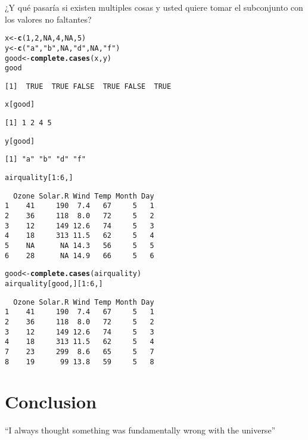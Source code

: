 \documentclass{article}\usepackage[]{graphicx}\usepackage[]{color}
\makeatletter
\newcommand{\hlnum}[1]{\textcolor[rgb]{0.686,0.059,0.569}{#1}}%
\newcommand{\hlstr}[1]{\textcolor[rgb]{0.192,0.494,0.8}{#1}}%
\newcommand{\hlopt}[1]{\textcolor[rgb]{0,0,0}{#1}}%
\newcommand{\hlstd}[1]{\textcolor[rgb]{0.345,0.345,0.345}{#1}}%
\newcommand{\hlkwb}[1]{\textcolor[rgb]{0.69,0.353,0.396}{#1}}%
\newcommand{\hlkwd}[1]{\textcolor[rgb]{0.737,0.353,0.396}{\textbf{#1}}}%
\newenvironment{kframe}{%
 \def\at@end@of@kframe{}%
 \ifinner\ifhmode%
  \def\at@end@of@kframe{\end{minipage}}%
  \begin{minipage}{\columnwidth}%
 \fi\fi%
 \def\FrameCommand##1{\hskip\@totalleftmargin \hskip-\fboxsep
 \colorbox{shadecolor}{##1}\hskip-\fboxsep
     \hskip-\linewidth \hskip-\@totalleftmargin \hskip\columnwidth}%
 \MakeFramed {\advance\hsize-\width
   \@totalleftmargin\z@ \linewidth\hsize
   \@setminipage}}%
 {\par\unskip\endMakeFramed%
 \at@end@of@kframe}
\newenvironment{knitrout}{}{} %
\makeatother
\begin{document}
    ¿Y qué pasaría si existen multiples cosas y usted quiere tomar el subconjunto con los valores no faltantes?
\begin{knitrout}
\color{fgcolor}\begin{kframe}
\begin{alltt}
  \hlstd{x} \hlkwb{<-} \hlkwd{c}\hlstd{(}\hlnum{1}\hlstd{,} \hlnum{2}\hlstd{,} \hlnum{NA}\hlstd{,} \hlnum{4}\hlstd{,} \hlnum{NA}\hlstd{,} \hlnum{5}\hlstd{)}
  \hlstd{y} \hlkwb{<-} \hlkwd{c}\hlstd{(}\hlstr{"a"}\hlstd{,} \hlstr{"b"}\hlstd{,} \hlnum{NA}\hlstd{,} \hlstr{"d"}\hlstd{,} \hlnum{NA}\hlstd{,} \hlstr{"f"}\hlstd{)}
  \hlstd{good} \hlkwb{<-} \hlkwd{complete.cases}\hlstd{(x, y)}
  \hlstd{good}
\end{alltt}
\begin{verbatim}
[1]  TRUE  TRUE FALSE  TRUE FALSE  TRUE
\end{verbatim}
\begin{alltt}
  \hlstd{x[good]}
\end{alltt}
\begin{verbatim}
[1] 1 2 4 5
\end{verbatim}
\begin{alltt}
  \hlstd{y[good]}
\end{alltt}
\begin{verbatim}
[1] "a" "b" "d" "f"
\end{verbatim}
\end{kframe}
\end{knitrout}

\begin{knitrout}
\color{fgcolor}\begin{kframe}
\begin{alltt}
  \hlstd{airquality[}\hlnum{1}\hlopt{:}\hlnum{6}\hlstd{, ]}
\end{alltt}
\begin{verbatim}
  Ozone Solar.R Wind Temp Month Day
1    41     190  7.4   67     5   1
2    36     118  8.0   72     5   2
3    12     149 12.6   74     5   3
4    18     313 11.5   62     5   4
5    NA      NA 14.3   56     5   5
6    28      NA 14.9   66     5   6
\end{verbatim}
\begin{alltt}
  \hlstd{good} \hlkwb{<-} \hlkwd{complete.cases}\hlstd{(airquality)}
  \hlstd{airquality[good, ][}\hlnum{1}\hlopt{:}\hlnum{6}\hlstd{, ]}
\end{alltt}
\begin{verbatim}
  Ozone Solar.R Wind Temp Month Day
1    41     190  7.4   67     5   1
2    36     118  8.0   72     5   2
3    12     149 12.6   74     5   3
4    18     313 11.5   62     5   4
7    23     299  8.6   65     5   7
8    19      99 13.8   59     5   8
\end{verbatim}
\end{kframe}
\end{knitrout}
\section{Conclusion}
``I always thought something was fundamentally wrong with the universe'' 
\end{document}
